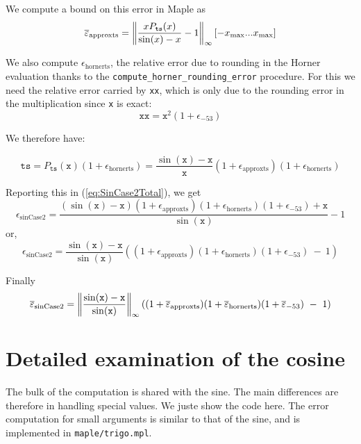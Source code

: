 We compute a bound on this error in Maple as 
$${\overline{\varepsilon}}_{\mathrm{approxts}} = \left\Vert \frac{xP_{\mathtt{ts}}(x)}{\sin(x)-x} -1 \right\Vert_{\infty}[-x_{\mathrm{max}}...x_{\mathrm{max}}]$$

We also compute $\epsilon_{\mathrm{hornerts}}$, the relative error due
to rounding in the Horner evaluation thanks to the
\texttt{compute\_horner\_rounding\_error} procedure. For this we need
the relative error carried by \texttt{xx}, which is only due to the
rounding error in the multiplication since \texttt{x} is exact:
$$\mathtt{xx}=\mathtt{x}^2(1+\epsilon_{-53})$$

We therefore have:

$$\mathtt{ts} = P_{\mathtt{ts}}(\mathtt{x})(1+\epsilon_{\mathrm{hornerts}}) = \frac{\sin(\mathtt{x})-\mathtt{x}}{\mathtt{x}}(1+\epsilon_{\mathrm{approxts}})(1+\epsilon_{\mathrm{hornerts}})$$

Reporting this in (\ref{eq:SinCase2Total}), we get 
\begin{equation*}
  \epsilon_{\mathrm{sinCase2}} = \frac{(\sin(\mathtt{x})-\mathtt{x})(1+\epsilon_{\mathrm{approxts}})(1+\epsilon_{\mathrm{hornerts}})(1+\epsilon_{-53}) + \mathtt{x}}{\sin(\mathtt{x})} -1
\end{equation*}
or,
\begin{equation*}
  \epsilon_{\mathrm{sinCase2}} =  \frac{\sin(\mathtt{x})-\mathtt{x}}{\sin(\mathtt{x})}\left((1+\epsilon_{\mathrm{approxts}})(1+\epsilon_{\mathrm{hornerts}})(1+\epsilon_{-53})\ -\ 1\right)
\end{equation*}

Finally
\begin{equation}
  \maxeps_{\mathrm{sinCase2}} =  \left\Vert\frac{\sin(\mathtt{x})-\mathtt{x}}{\sin(\mathtt{x})}\right\Vert_{\infty}((1+\maxeps_{\mathrm{approxts}})(1+\maxeps_{\mathrm{hornerts}})(1+\maxeps_{-53})\ -\ 1)
  \label{eq:SinCase2Total2}
\end{equation}
 



\section{Detailed examination of the cosine}
The bulk of the computation is shared with the sine.  The main
differences are therefore in handling special values. We juste show
the code here. The error computation for small arguments is similar to
that of the sine, and is implemented in \texttt{maple/trigo.mpl}.

